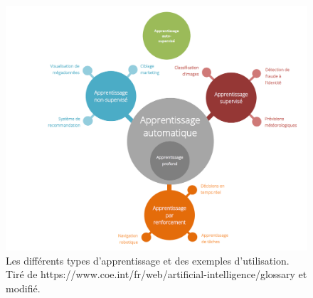 \begin{figure}
  \centering
  \includegraphics[width=.95\textwidth]{./Chapitre2/figures/typeApprentissage.png}
  \caption{Les différents types d'apprentissage et des exemples d'utilisation. Tiré de https://www.coe.int/fr/web/artificial-intelligence/glossary et modifié.} 
  \label{fig:typesApprentissage}
\end{figure}
